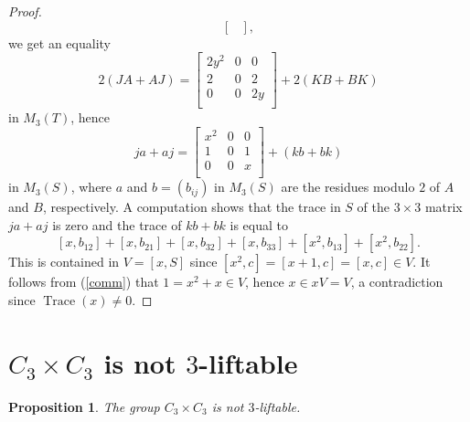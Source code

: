 \documentclass[12pt]{amsart}
\numberwithin{equation}{section}
\newtheorem{proposition}[equation]{Proposition}
\theoremstyle{definition}
\renewcommand{\(}{\bigl(}
\renewcommand{\)}{\bigr)}
\begin{document}
\begin{proof}
\[\begin{bmatrix}
\end{bmatrix},
\]
we get an equality
\[
2(J A+A J)=\begin{bmatrix}
2{y}^2 &  0  & 0\\
2 &   0 &  2\\
0 &   0 & 2{y} \\
\end{bmatrix}+2(K B+ B K)
\]
in $M_3(T)$, hence
\begin{equation}\label{comm}
ja+ aj=\begin{bmatrix}
{x}^2 &  0  & 0\\
1 &   0 &  1\\
0 &   0 & x \\
\end{bmatrix}+( kb+ bk)
\end{equation}
in $M_3(S)$, where $a$ and $b=(b_{ij})$ in $M_3(S)$ are the residues modulo $2$ of $A$ and $B$, respectively.
A computation shows that the trace
in $S$ of the $3\times 3$ matrix $ja+ aj$ is zero and the trace of $kb+ bk$ is equal to
\[
[x, b_{12}]+[x, b_{21}]+[x, b_{32}]+[x, b_{33}]+[x^2, b_{13}]+[x^2, b_{22}].
\]
This is contained in $V=[x,S]$ since $[x^2,c]=[x+1,c]=[x,c]\in V$. It follows from (\ref{comm})
that $1=x^2+x\in V$, hence $x\in xV=V$, a contradiction since $\operatorname{Trace}(x)\neq 0$.
\end{proof}

\section{$C_3 \times C_3$ is not $3$-liftable}

\begin{proposition}\label{33}\cite[Claim 5.4]{MS26}
The group $C_3 \times C_3$ is not $3$-liftable.
\end{proposition}
\end{document}
